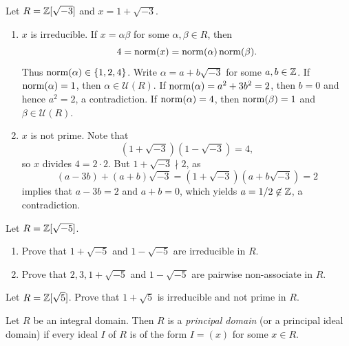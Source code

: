 \begin{example}
	Let $R=\mathbb{Z}[\sqrt{-3}]$ and $x=1+\sqrt{-3}$. 
	\begin{enumerate}
		\item $x$ is irreducible. 
	If $x=\alpha\beta$ for some $\alpha,\beta\in R$, then 
	\[
 4=\operatorname{norm}(x)=\operatorname{norm}(\alpha)\operatorname{norm}(\beta).
 \]
 Thus $\operatorname{norm}(\alpha)\in\{1,2,4\}$. 
	Write $\alpha=a+b\sqrt{-3}$ for some $a,b\in\mathbb{Z}$. 
    If $\operatorname{norm}(\alpha)=1$, then $\alpha\in\mathcal{U}(R)$.
	If $\operatorname{norm}(\alpha)=a^2+3b^2=2$, then $b=0$ and hence
	$a^2=2$, a contradiction. 
	If $\operatorname{norm}(\alpha)=4$, then $\operatorname{norm}(\beta)=1$ and $\beta\in\mathcal{U}(R)$. 
%
%	
%	
		\item $x$ is not prime. Note that 
  \[
  (1+\sqrt{-3})(1-\sqrt{-3})=4,
  \]
  so  
		$x$ divides $4=2\cdot 2$. But $1+\sqrt{-3}\nmid 2$, as 
		\[
		(a-3b)+(a+b)\sqrt{-3}=(1+\sqrt{-3})(a+b\sqrt{-3})=2
		\]
		implies that $a-3b=2$ and $a+b=0$, which yields 
		$a=1/2\not\in\mathbb{Z}$, a contradiction.
	\end{enumerate}
\end{example}

\begin{exercise}
	Let $R=\mathbb{Z}[\sqrt{-5}]$. 
	\begin{enumerate}
		\item Prove that $1+\sqrt{-5}$ and $1-\sqrt{-5}$ are irreducible in $R$. 
		\item Prove that $2,3,1+\sqrt{-5}$ and $1-\sqrt{-5}$ are pairwise 
      non-associate in $R$.
	\end{enumerate}
\end{exercise}

\begin{exercise}
	Let $R=\mathbb{Z}[\sqrt{5}]$. 
	Prove that $1+\sqrt{5}$ is irreducible and not prime in $R$. 	
\end{exercise}

\begin{definition}
	Let $R$ be an integral domain. Then $R$ is a \emph{principal domain} 
	(or a principal ideal domain) if
	every ideal $I$ of $R$ is of the form $I=(x)$ for some $x\in R$.   
\end{definition}

